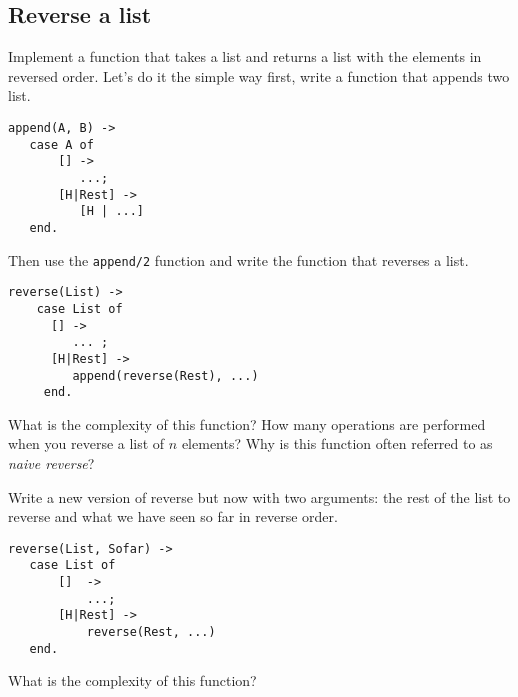 \documentclass[a4paper,11pt]{article}
\begin{document}
\subsection{Reverse a list}

Implement a function that takes a list and returns a list with the
elements in reversed order. Let's do it the simple way first, write
a function that appends two list.

\begin{verbatim}
append(A, B) ->
   case A of
       [] -> 
          ...;
       [H|Rest] ->
          [H | ...]
   end.
\end{verbatim}

Then use the {\tt append/2} function and write the function that reverses a list.

\begin{verbatim}
reverse(List) ->
    case List of 
      [] -> 
         ... ;
      [H|Rest] ->
         append(reverse(Rest), ...)
     end.
\end{verbatim}

What is the complexity of this function? How many operations are
performed when you reverse a list of $n$ elements? Why is this
function often referred to as {\em naive reverse}?

Write a new version of reverse but now with two arguments: the rest of the list
to reverse and what we have seen so far in reverse order.

\begin{verbatim}
reverse(List, Sofar) ->
   case List of 
       []  ->
           ...;
       [H|Rest] ->
           reverse(Rest, ...)
   end.
\end{verbatim}

What is the complexity of this function?
\end{document}
